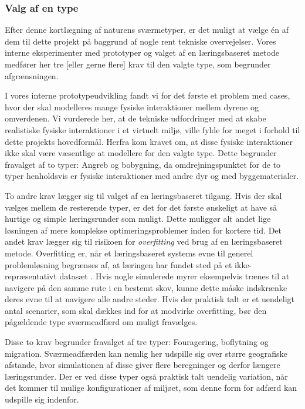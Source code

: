 \subsubsection{Valg af en type}
Efter denne kortlægning af naturens sværmetyper, er det muligt at vælge én af dem til dette projekt på baggrund af nogle rent tekniske overvejelser. Vores interne eksperimenter med prototyper og valget af en læringsbaseret metode medfører her tre [eller gerne flere] krav til den valgte type, som begrunder afgrænsningen. 
\par
I vores interne prototypeudvikling fandt vi for det første et problem med cases, hvor der skal modelleres mange fysiske interaktioner mellem dyrene og omverdenen. Vi vurderede her, at de tekniske udfordringer med at skabe realistiske fysiske interaktioner i et virtuelt miljø, ville fylde for meget i forhold til dette projekts hovedformål. Herfra kom kravet om, at disse fysiske interaktioner ikke skal være væsentlige at modellere for den valgte type. Dette begrunder fravalget af to typer: Angreb og bobygning, da omdrejningspunktet for de to typer henholdsvis er fysiske interaktioner med andre dyr og med byggematerialer. 
\par
To andre krav lægger sig til valget af en læringsbaseret tilgang. Hvis der skal vælges mellem de resterende typer, er det for det første ønskeligt at have så hurtige og simple læringsrunder som muligt. Dette muliggør alt andet lige løsningen af mere komplekse optimeringsproblemer inden for kortere tid. Det andet krav lægger sig til risikoen for \textit{overfitting} ved brug af en læringsbaseret metode. Overfitting er, når et læringsbaseret systems evne til generel problemløsning begrænses af, at læringen har fundet sted på et ikke-repræsentativt datasæt \cite{hawkins2004}. Hvis nogle simulerede myrer eksempelvis trænes til at navigere på den samme rute i en bestemt skov, kunne dette måske indskrænke deres evne til at navigere alle andre steder.
Hvis der praktisk talt er et uendeligt antal scenarier, som skal dækkes ind for at modvirke overfitting, bør den pågældende type sværmeadfærd om muligt fravælges. 
\par
Disse to krav begrunder fravalget af tre typer: Fouragering, boflytning og migration. Sværmeadfærden kan nemlig her udspille sig over større geografiske afstande, hvor simulationen af disse giver flere beregninger og derfor længere læringsrunder. Der er ved disse typer også praktisk talt uendelig variation, når det kommer til mulige konfigurationer af miljøet, som denne form for adfærd kan udspille sig indenfor. 
